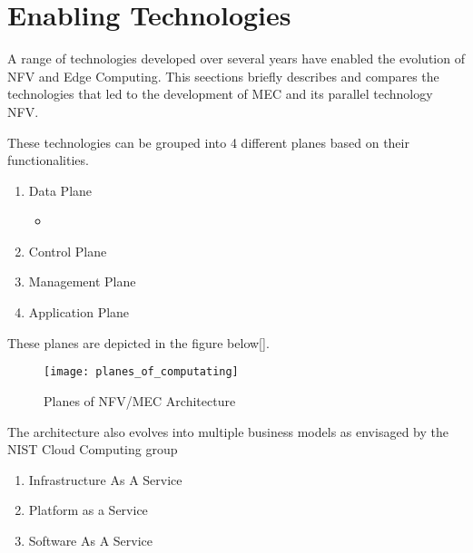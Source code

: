 \section{Enabling Technologies}

A range of technologies developed over several years have enabled the evolution of NFV and Edge Computing. This seections briefly describes and compares the technologies that led to the development of MEC and its parallel technology NFV.

These technologies can be grouped into 4 different planes based on their functionalities.

\begin{enumerate}
    \item Data Plane
	\begin{itemize}
	    \item
        \end{itemize}
    \item Control Plane
	\begin{itemize}
        \end{itemize}
    \item Management Plane
	\begin{itemize}
	\end{itemize}
    \item Application Plane
	\begin{itemize}
	\end{itemize}
\end{enumerate}

These planes are depicted in the figure below[].

\begin{figure}
	\centering
        \texttt{[image: planes\_of\_computating]}
	\label{fig:figure6}
	\caption{Planes of NFV/MEC Architecture}
\end{figure}

The architecture also evolves into multiple business models as envisaged by the NIST Cloud Computing group

\begin{enumerate}
    \item Infrastructure As A Service
    \item Platform as a Service
    \item Software As A Service
\end{enumerate}
